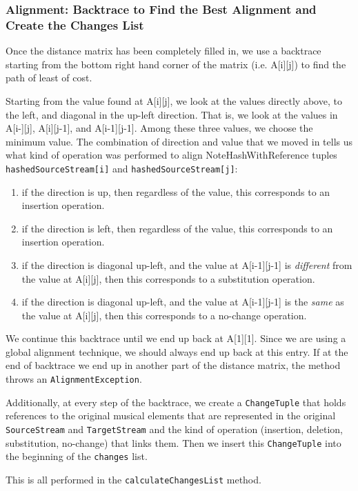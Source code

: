 \subsubsection{Alignment: Backtrace to Find the Best Alignment and Create the Changes List}
Once the distance matrix has been completely filled in, we use a backtrace starting from the bottom right hand corner of the matrix (i.e. A[i][j]) to find the path of least of cost. 

Starting from the value found at A[i][j], we look at the values directly above, to the left, and diagonal in the up-left direction. That is, we look at the values in A[i-][j], A[i][j-1], and A[i-1][j-1]. Among these three values, we choose the minimum value. The combination of direction and value that we moved in tells us what kind of operation was performed to align NoteHashWithReference tuples \texttt{hashedSourceStream[i]} and \texttt{hashedSourceStream[j]}:
\begin{enumerate}
\item if the direction is up, then regardless of the value, this corresponds to an insertion operation.
\item if the direction is left, then regardless of the value, this corresponds to an insertion operation.
\item if the direction is diagonal up-left, and the value at A[i-1][j-1] is \textit{different} from the value at A[i][j], then this corresponds to a substitution operation.
\item if the direction is diagonal up-left, and the value at A[i-1][j-1] is the \textit{same} as the value at A[i][j], then this corresponds to a no-change operation.
\end{enumerate}  

We continue this backtrace until we end up back at A[1][1]. Since we are using a global alignment technique, we should always end up back at this entry. If at the end of backtrace we end up in another part of the distance matrix, the method throws an \texttt{AlignmentException}. 

Additionally, at every step of the backtrace, we create a \texttt{ChangeTuple} that holds references to the original musical elements that are represented in the original \texttt{SourceStream} and \texttt{TargetStream} and the kind of operation (insertion, deletion, substitution, no-change) that links them. Then we insert this \texttt{ChangeTuple} into the beginning of the \texttt{changes} list.

This is all performed in the \texttt{calculateChangesList} method. 

